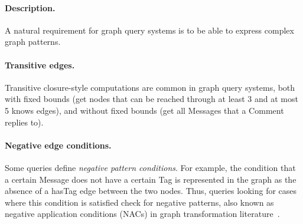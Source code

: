 
\paragraph{Description.}

A natural requirement for graph query systems is to be able to express complex
graph patterns.

\paragraph{Transitive edges.} Transitive closure-style computations are common
in graph query systems, both with fixed bounds (\eg get nodes that can be
reached through at least 3 and at most 5 \textsf{knows} edges), and without
fixed bounds (\eg get all \textsf{Messages} that a \textsf{Comment} replies to).

\paragraph{Negative edge conditions.} Some queries define \emph{negative pattern
conditions}. For example, the condition that a certain \textsf{Message} does not
have a certain \textsf{Tag} is represented in the graph as the absence of a
\textsf{hasTag} edge between the two nodes. Thus, queries looking for cases
where this condition is satisfied check for negative patterns, also known as
negative application conditions (NACs) in graph transformation
literature~\cite{DBLP:journals/fuin/HabelHT96}.


